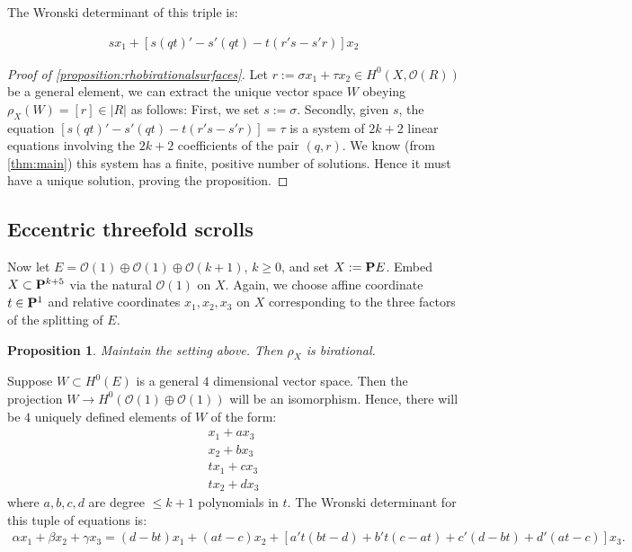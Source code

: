 \documentclass[11pt,reqno]{amsart}
\theoremstyle{plain}
\newtheorem{proposition}[theorem]{Proposition}
\theoremstyle{definition}
\theoremstyle{remark}
\numberwithin{equation}{section}
\renewcommand{\to}{{\longrightarrow}}
\numberwithin{equation}{section}
\renewcommand{\O}{\mathcal O}
\begin{document}
The Wronski determinant of this triple is: 

\begin{align}\label{equation:jacobsurface}
	sx_{1} + \left[s(qt)' - s'(qt) - t(r's-s'r)\right]x_{2}
\end{align}

\begin{proof}[Proof of \autoref{proposition:rhobirationalsurfaces}]
	Let $r := \sigma x_{1} + \tau x_{2} \in H^{0}(X,\O(R))$ be a general element, we can extract the unique vector space $W$ obeying $\rho_{X}(W) = [r] \in |R|$ as follows: First, we set $s := \sigma$. Secondly, given $s$, the equation $\left[s(qt)' - s'(qt) - t(r's-s'r)\right] = \tau$ is a system of $2k+2$ linear equations involving the $2k+2$ coefficients of the pair $(q,r)$. We know (from \autoref{thm:main})  this system has a finite, positive number of solutions. Hence it must have a unique solution, proving the proposition.
\end{proof}

\subsection{Eccentric threefold scrolls} %
\label{sub:eccentric_threefolds}
Now let $E = \O(1) \oplus \O(1) \oplus \O(k+1)$, $k \geq 0$, and set $X := \P E$.  Embed $X \subset \P^{k+5}$ via the natural $\O(1)$ on $X$. Again, we choose affine coordinate $t \in \P^{1}$ and relative coordinates $x_{1},x_{2},x_{3}$ on $X$ corresponding to the three factors of the splitting of $E$. 

\begin{proposition}\label{proposition:threefold}
Maintain the setting above. Then	$\rho_{X}$ is birational.
\end{proposition}

Suppose $W \subset H^{0}(E)$ is a general $4$ dimensional vector space. Then the projection $W \to H^{0}(\O(1)\oplus \O(1))$ will be an isomorphism.  Hence, there will be $4$ uniquely defined elements of $W$ of the form: 
\begin{align*}
	x_{1} + ax_{3}\\
	x_{2} + bx_{3}\\
	tx_{1} + cx_{3}\\
	tx_{2} + d x_{3}
\end{align*}
where $a,b,c,d$ are degree $\leq k+1$ polynomials in $t$.
The Wronski determinant for this tuple of equations is: 
\begin{align}\label{eq:jacobianthreefold}
	\alpha x_{1} + \beta x_{2} + \gamma x_{3} = (d-bt)x_{1} + (at-c)x_{2} + \left[a't(bt-d) + b't(c-at) + c'(d-bt)+ d'(at-c) \right]x_{3}.
\end{align}
\end{document}
